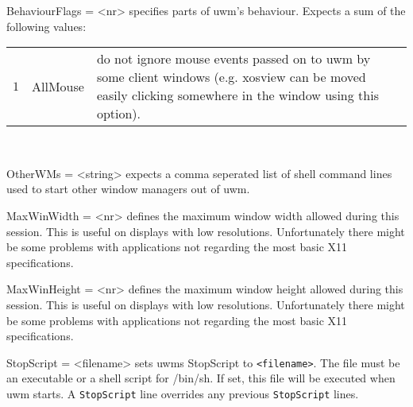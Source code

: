 \documentclass[10pt,a4paper]{article}
\newenvironment{ttdesc}[1]{
   \begin{list}{}{
          \renewcommand{\makelabel}[1]{\texttt{##1\hfill}}}}{\end{list}}
\begin{document}
\begin{ttdesc}{description}
\item[BehaviourFlags = <nr>] specifies parts of uwm's behaviour. Expects a sum of the following values:\\
\begin{tabular}{rlp{7cm}l}
$1$  & AllMouse & do not ignore mouse events passed on to uwm by some client windows (e.g. xosview can be moved easily clicking somewhere in the window using this option).\\
\end{tabular}\\

\item[OtherWMs = <string>] expects a comma seperated list of shell command lines used to start other window managers out of uwm.

\item[MaxWinWidth = <nr>] defines the maximum window width allowed during this session. This is useful on displays with low resolutions. Unfortunately there might be some problems with applications not regarding the most basic X11 specifications.

\item[MaxWinHeight = <nr>] defines the maximum window height allowed during this session. This is useful on displays with low resolutions. Unfortunately there might be some problems with applications not regarding the most basic X11 specifications.

\item[StopScript = <filename>] sets uwms StopScript to \texttt{<filename>}. The file must be an executable or a shell script for /bin/sh. If set, this file will be executed when uwm starts. A \texttt{StopScript} line overrides any previous \texttt{StopScript} lines.


\end{ttdesc}
\end{document}
